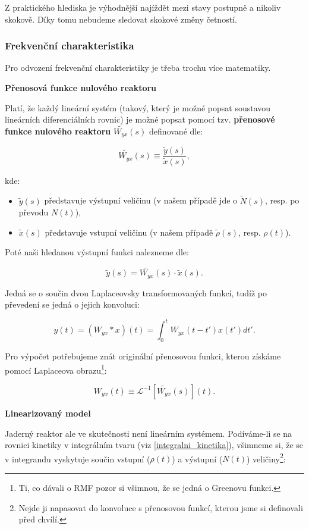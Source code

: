Z praktického hlediska je výhodnější najíždět mezi stavy postupně a nikoliv skokově. Díky tomu nebudeme sledovat skokové změny četností.

\subsubsection{Frekvenční charakteristika}

Pro odvození frekvenční charakteristiky je třeba trochu více matematiky.

\textbf{Přenosová funkce nulového reaktoru}

Platí, že každý lineární systém (takový, který je možné popsat soustavou lineárních diferenciálních rovnic) je možné popsat pomocí tzv. \textbf{přenosové funkce nulového reaktoru} $\tilde{W_{yx}}(s)$ definované dle:

\begin{equation}
  \boxed{
  \tilde{W_{yx}}(s) \equiv \dfrac{\tilde{y}(s)}{\tilde{x}(s)},
  \label{prenosova_funkce_definice}}
\end{equation}

kde:

\begin{itemize}
  \item $\tilde{y}(s)$ představuje výstupní veličinu (v našem případě jde o $\tilde{N}(s)$, resp. po převodu $N(t)$),
  \item $\tilde{x}(s)$ představuje vstupní veličinu (v našem případě $\tilde{\rho}(s)$, resp. $\rho(t)$).
\end{itemize}

Poté naši hledanou výstupní funkci nalezneme dle:

$$ \tilde{y}(s) = \tilde{W_{yx}}(s) \cdot \tilde{x}(s). $$

Jedná se o součin dvou Laplaceovsky transformovaných funkcí, tudíž po převedení se jedná o jejich konvoluci:

$$ y(t) = (W_{yx} * x ) (t) = \int_0^t W_{yx}(t-t') x(t') dt'. $$

Pro výpočet potřebujeme znát originální přenosovou funkci, kterou získáme pomocí Laplaceova obrazu\footnote{Ti, co dávali o RMF pozor si všimnou, že se jedná o Greenovu funkci.}:

$$ W_{yx}(t) \equiv \mathcal{L}^{-1}[\tilde{W_{yx}}(s)](t). $$

\textbf{Linearizovaný model}

Jaderný reaktor ale ve skutečnosti není lineárním systémem. Podíváme-li se na rovnici kinetiky v integrálním tvaru (viz \eqref{integralni_kinetika}), všimneme si, že se v integrandu vyskytuje součin vstupní ($\rho(t)$) a výstupní ($N(t)$) veličiny\footnote{Nejde ji napasovat do konvoluce s přenosovou funkcí, kterou jsme si definovali před chvílí.}:

